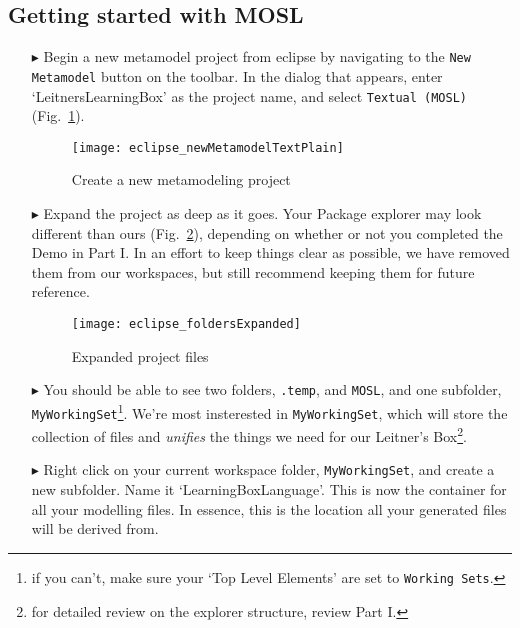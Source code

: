 \clearpage
\subsection{Getting started with MOSL}
\texHeader
\hypertarget{static:starting tex}{}

\begin{itemize}

\item[$\blacktriangleright$] \hypertarget{static tex}{Begin a} new metamodel project from eclipse by navigating to the \texttt{New Metamodel} button on the
toolbar. In the dialog that appears, enter `LeitnersLearningBox' as the project name, and select \texttt{Textual (MOSL)}  (Fig.~\ref{fig:new_project}).

\begin{figure}[htbp]
	\centering
  \texttt{[image: eclipse\_newMetamodelTextPlain]}
	\caption{Create a new metamodeling project}
	\label{fig:new_project}
\end{figure}

\item[$\blacktriangleright$] Expand the project as deep as it goes. Your Package explorer may look different than ours (Fig.~\ref{fig:expanded_folders}),
depending on whether or not you completed the Demo in Part I. In an effort to keep things clear as possible, we have removed them from our workspaces, but
still recommend keeping them for future reference.

\begin{figure}[htbp]
	\centering
  \texttt{[image: eclipse\_foldersExpanded]}
	\caption{Expanded project files}
	\label{fig:expanded_folders}
\end{figure} 

\clearpage

\item[$\blacktriangleright$] You should be able to see two folders, \texttt{.temp}, and \texttt{MOSL}, and one subfolder, \texttt{MyWorkingSet}\footnote{if you
can't, make sure your `Top Level Elements' are set to \texttt{Working Sets}.}. We're most insterested in \texttt{MyWorkingSet}, which will store the collection
of files and \emph{unifies} the things we need for our Leitner's Box\footnote{for detailed review on the explorer structure, review Part I.}.

\vspace{0.5cm}

\item[$\blacktriangleright$] Right click on your current workspace folder, \texttt{MyWorkingSet}, and create a new subfolder. Name it
`LearningBoxLanguage'. This is now the container for all your modelling files. In essence, this is the location all your generated
files will be derived from.


\end{itemize}
